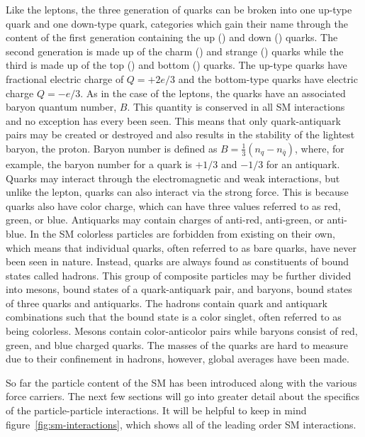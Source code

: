 Like the leptons, the three generation of quarks can be broken into one up-type quark and one down-type quark, categories which gain their name through the content of the first generation containing the up (\cPqu) and down (\cPqd) quarks.
The second generation is made up of the charm (\cPqc) and strange (\cPqs) quarks while the third is made up of the top (\cPqt) and bottom (\cPqb) quarks.
The up-type quarks have fractional electric charge of $Q=+2e/3$ and the bottom-type quarks have electric charge $Q=-e/3$.
As in the case of the leptons, the quarks have an associated baryon quantum number, $B$.
This quantity is conserved in all SM interactions and no exception has every been seen.
This means that only quark-antiquark pairs may be created or destroyed and also results in the stability of the lightest baryon, the proton.
Baryon number is defined as $B=\frac{1}{3}\left(n_{q}-n_{\bar{q}}\right)$, where, for example, the baryon number for a quark is $+1/3$ and $-1/3$ for an antiquark.
Quarks may interact through the electromagnetic and weak interactions, but unlike the lepton, quarks can also interact via the strong force.
This is because quarks also have color charge, which can have three values referred to as red, green, or blue. 
Antiquarks may contain charges of anti-red, anti-green, or anti-blue.
In the SM colorless particles are forbidden from existing on their own, which means that individual quarks, often referred to as bare quarks, have never been seen in nature.
Instead, quarks are always found as constituents of bound states called hadrons.
This group of composite particles may be further divided into mesons, bound states of a quark-antiquark pair, and baryons, bound states of three quarks and antiquarks.
The hadrons contain quark and antiquark combinations such that the bound state is a color singlet, often referred to as being colorless.
Mesons contain color-anticolor pairs while baryons consist of red, green, and blue charged quarks.
The masses of the quarks are hard to measure due to their confinement in hadrons, however, global averages have been made.

So far the particle content of the SM has been introduced along with the various force carriers.
The next few sections will go into greater detail about the specifics of the particle-particle interactions.
It will be helpful to keep in mind figure~\ref{fig:sm-interactions}, which shows all of the leading order SM interactions.


